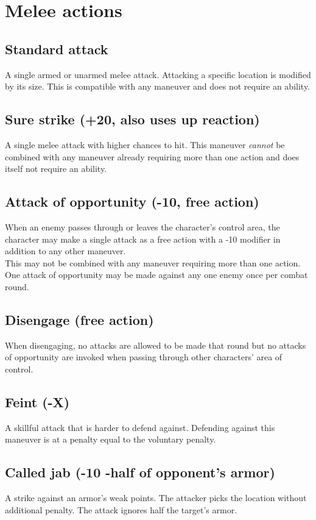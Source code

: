 \section{Melee actions}
\subsection*{Standard attack}
A single armed or unarmed melee attack. Attacking a specific location is modified by its size. This is compatible with any maneuver and does not require an ability. 
\subsection*{Sure strike (+20, also uses up reaction)}
A single melee attack with higher chances to hit. This maneuver \emph{cannot} be combined with any maneuver already requiring more than one action and does itself not require an ability.
\subsection*{Attack of opportunity (-10, free action)}
When an enemy passes through or leaves the character’s control area, the character may make a single attack as a free action with a -10 modifier in addition to any other maneuver.\\
This may not be combined with any maneuver requiring more than one action.\\
One attack of opportunity may be made against any one enemy once per combat round.
\pagebreak %
\subsection*{Disengage (free action)}
\label{action:disengage}
When disengaging, no attacks are allowed to be made that round but no attacks of opportunity are invoked when passing through other characters' area of control.
\subsection*{Feint (-X)}
A skillful attack that is harder to defend against. Defending against this maneuver is at a penalty equal to the voluntary penalty.
\subsection*{Called jab (-10 -half of opponent’s armor)}
A strike against an armor’s weak points. The attacker picks the location without additional penalty. The attack ignores half the target’s armor.
